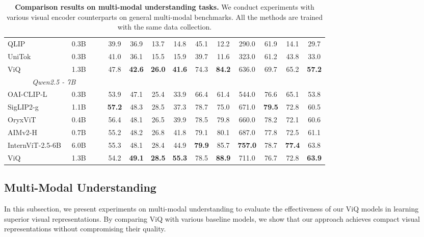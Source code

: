 \documentclass{llmxive}
\begin{document}
\begin{table}[t]
\begin{adjustbox}{width=\linewidth}
\begin{tabular}{lccccccccccccc}
    \midrule
    QLIP~\cite{zhao2025qlip}  &   0.3B    &     &      &39.9 &	36.9 &	13.7 &	14.8 &	45.1 &	12.2 &	290.0 &	61.9 	&14.1 &	29.7 \\
    UniTok~\cite{ma2025unitok} &   0.3B    &        &     &  41.0 &	36.1 &	15.5 	&15.9 &	39.7 &	11.6 	&323.0 &	61.2 &	43.8 &33.0  \\
    \midrule
    \rowcolor{red!10} ViQ & 1.3B  &        &        & 47.8  & \textbf{42.6}  & \textbf{26.0}  & \textbf{41.6}  & 74.3  & \textbf{84.2}  & 636.0  & 69.7  & 65.2  & \textbf{57.2}\\
    \midrule
    \multicolumn{4}{c}{\textit{Qwen2.5 - 7B}} \\
    \midrule
    OAI-CLIP-L~\cite{radford2021clip} &    0.3B   &        &        & 53.9 & 	47.1 & 	25.4 & 	33.9 	& 66.4 	& 61.4 & 	544.0 & 	76.6 & 	65.1 	& 53.8 \\
    SigLIP2-g~\cite{tschannen2025siglip} & 1.1B    &     &        & \textbf{57.2} &	48.3 &	28.5 &	37.3 &	78.7 &	75.0 	&671.0 &	\textbf{79.5} &	72.8 &	60.5   \\
    \midrule
    OryxViT~\cite{liu2024oryx} & 0.4B &        &        &   56.4    &    48.1   &   26.5    &   39.9    &   78.5   &  79.8  &    660.0   &  78.2     &   72.1      & 60.6  \\
    AIMv2-H~\cite{fini2025multimodal} &    0.7B    &      &        & 55.2 &	48.2 &	26.8 &	41.8 &	79.1 &	80.1 	&687.0 	&77.8 &	72.5 &	61.1 \\
    InternViT-2.5-6B~\cite{chen2412expanding} &   6.0B     &      &        & 55.3 &	48.1 &	28.4 &	44.9 &	\textbf{79.9} &	85.7 &	\textbf{757.0} &	78.7 &	\textbf{77.4} 	&63.8 \\
    \midrule
    \rowcolor{red!10} ViQ & 1.3B  &       &        & 54.2  & \textbf{49.1}  & \textbf{28.5}  & \textbf{55.3}  & 78.5  & \textbf{88.9}  & 711.0   & 76.7  & 72.8  & \textbf{63.9}  \\
    \bottomrule
    \end{tabular}
  \end{adjustbox}
  \label{tab:multimodal}
\caption{\textbf{Comparison results on multi-modal understanding tasks.} We conduct experiments with various visual encoder counterparts on general multi-modal benchmarks. All the methods are trained with the same data collection.}
\end{table}

\subsection{Multi-Modal Understanding}
In this subsection, we present experiments on multi-modal understanding to evaluate the effectiveness of our ViQ models in learning superior visual representations. By comparing ViQ with various baseline models, we show that our approach achieves compact visual representations without compromising their quality.
\end{document}

